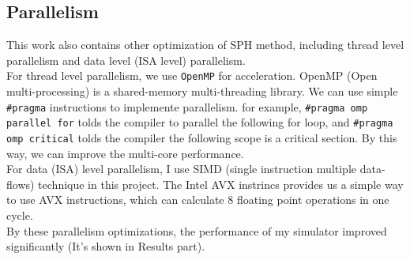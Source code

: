 \documentclass[acmtog]{acmart}
\begin{document}
\subsection{Parallelism}
This work also contains other optimization of SPH method, including thread level parallelism and 
data level (ISA level) parallelism.\\
For thread level parallelism, we use \texttt{OpenMP} for acceleration. OpenMP (Open multi-processing) 
is a shared-memory multi-threading library. We can use simple \texttt{\#pragma} instructions to 
implemente parallelism. for example, \texttt{\#pragma omp parallel for} tolds the compiler to 
parallel the following for loop, and \texttt{\#pragma omp critical} tolds the compiler the following 
scope is a critical section. By this way, we can improve the multi-core performance.\\
For data (ISA) level parallelism, I use SIMD (single instruction multiple data-flows) technique in 
this project. The Intel AVX instrincs provides us a simple way to use AVX instructions, which can 
calculate 8 floating point operations in one cycle.\\
By these parallelism optimizations, the performance of my simulator improved significantly (It's
shown in Results part).
\end{document}
